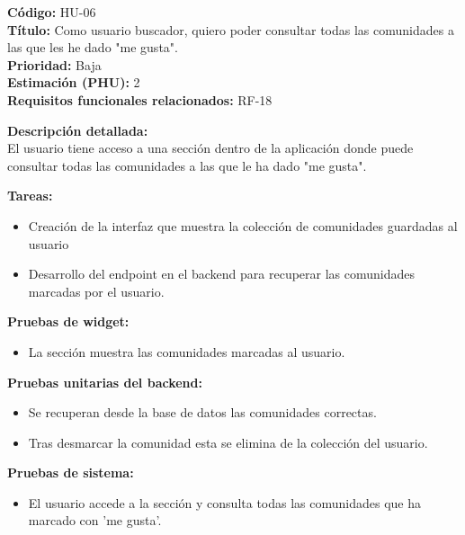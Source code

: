\begin{tarjetaHU}
\textbf{Código:} HU-06 \\
\textbf{Título:} Como usuario buscador, quiero poder consultar todas las comunidades a las que les he dado "me gusta". \\
\textbf{Prioridad:} Baja \\
\textbf{Estimación (PHU):} 2 \\
\textbf{Requisitos funcionales relacionados:} RF-18

\vspace{0.5em}
\textbf{Descripción detallada:} \\
El usuario tiene acceso a una sección dentro de la aplicación donde puede consultar todas las comunidades a las que le ha dado "me gusta".

\vspace{0.5em}
\textbf{Tareas:}
\begin{itemize}[left=0pt]
  \item Creación de la interfaz que muestra la colección de comunidades guardadas al usuario
  \item Desarrollo del endpoint en el backend para recuperar las comunidades marcadas por el usuario.
\end{itemize}

\vspace{0.5em}
\textbf{Pruebas de widget:}
\begin{itemize}[left=0pt]
  \item La sección muestra las comunidades marcadas al usuario.
\end{itemize}
\textbf{Pruebas unitarias del backend:}
\begin{itemize}[left=0pt]
  \item Se recuperan desde la base de datos las comunidades correctas.
  \item Tras desmarcar la comunidad esta se elimina de la colección del usuario.
\end{itemize}
\textbf{Pruebas de sistema:}
\begin{itemize}[left=0pt]
  \item El usuario accede a la sección y consulta todas las comunidades que ha marcado con 'me gusta'.
\end{itemize}
\end{tarjetaHU}



